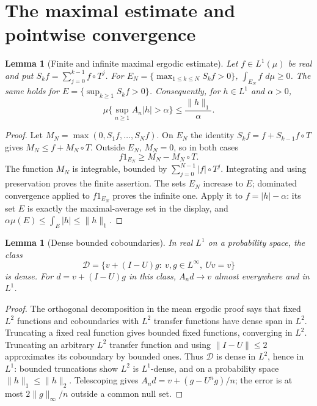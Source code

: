 \documentclass[11pt,oneside]{book}
\newtheorem{lemma}[theorem]{Lemma}
\theoremstyle{definition}
\theoremstyle{remark}\newtheorem{remark}[theorem]{Remark}
\newcommand{\dd}{\,d}\newcommand{\id}{\operatorname{id}}
\newcommand{\abs}[1]{\lvert#1\rvert}\newcommand{\norm}[1]{\lVert#1\rVert}
\begin{document}
\section{The maximal estimate and pointwise convergence}

\begin{lemma}[Finite and infinite maximal ergodic estimate]\label{d13:19:maximal-lemma}
Let \(f\in L^1(\mu)\) be real and put
\(S_kf=\sum_{j=0}^{k-1}f\circ T^j\).
For \(E_N=\{\max_{1\leq k\leq N}S_kf>0\}\),
\(\int_{E_N}f\,\dd\mu\geq0\).
The same holds for \(E=\{\sup_{k\geq1}S_kf>0\}\).
Consequently, for \(h\in L^1\) and \(\alpha>0\),
\[
 \mu\{\sup_{n\geq1}A_n\abs{h}>\alpha\}
       \leq\frac{\norm{h}_1}{\alpha}.
\]
\end{lemma}
\begin{proof}
Let \(M_N=\max(0,S_1f,\ldots,S_Nf)\). On \(E_N\) the identity
\(S_kf=f+S_{k-1}f\circ T\) gives
\(M_N\leq f+M_N\circ T\).
Outside \(E_N\), \(M_N=0\), so in both cases
\[
 f1_{E_N}\geq M_N-M_N\circ T.
\]
The function \(M_N\) is integrable, bounded by
\(\sum_{j=0}^{N-1}\abs{f}\circ T^j\). Integrating and using preservation
proves the finite assertion. The sets \(E_N\) increase to \(E\);
dominated convergence applied to \(f1_{E_N}\) proves the infinite one.
Apply it to \(f=\abs{h}-\alpha\): its set \(E\) is exactly the
maximal-average set in the display, and
\(\alpha\mu(E)\leq\int_E\abs{h}\leq\norm{h}_1\).
\end{proof}

\begin{lemma}[Dense bounded coboundaries]\label{d13:19:dense-coboundaries}
In real \(L^1\) on a probability space, the class
\[
 \mathcal D=\{v+(I-U)g:\ v,g\in L^\infty,\ Uv=v\}
\]
is dense. For \(d=v+(I-U)g\) in this class, \(A_nd\to v\) almost
everywhere and in \(L^1\).
\end{lemma}
\begin{proof}
The orthogonal decomposition in the mean ergodic proof says that
fixed \(L^2\) functions and coboundaries with \(L^2\) transfer
functions have dense span in \(L^2\).
Truncating a fixed real function gives bounded fixed functions,
converging in \(L^2\). Truncating an arbitrary \(L^2\) transfer
function and using \(\norm{I-U}\leq2\) approximates its coboundary
by bounded ones. Thus \(\mathcal D\) is dense in \(L^2\), hence in
\(L^1\): bounded truncations show \(L^2\) is \(L^1\)-dense, and on
a probability space \(\norm{h}_1\leq\norm{h}_2\).
Telescoping gives
\(A_nd=v+(g-U^ng)/n\); the error is at most
\(2\norm{g}_\infty/n\) outside a common null set.
\end{proof}
\end{document}
